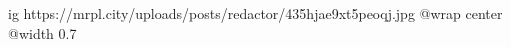  
 
 
 
 

\ifcmt
  ig https://mrpl.city/uploads/posts/redactor/435hjae9xt5peoqj.jpg
  @wrap center
  @width 0.7
\fi
